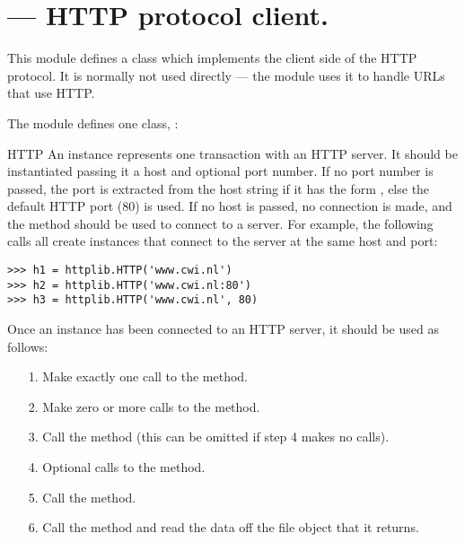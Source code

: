 \section{ ---
         HTTP protocol client.}




This module defines a class which implements the client side of the
HTTP protocol.  It is normally not used directly --- the module
 uses it to handle URLs that use
HTTP.

The module defines one class, :

\begin{classdesc}{HTTP}{}
An  instance
represents one transaction with an HTTP server.  It should be
instantiated passing it a host and optional port number.  If no port
number is passed, the port is extracted from the host string if it has
the form , else the default HTTP port (80)
is used.  If no host is passed, no connection is made, and the
 method should be used to connect to a server.  For
example, the following calls all create instances that connect to the
server at the same host and port:

\begin{verbatim}
>>> h1 = httplib.HTTP('www.cwi.nl')
>>> h2 = httplib.HTTP('www.cwi.nl:80')
>>> h3 = httplib.HTTP('www.cwi.nl', 80)
\end{verbatim}

Once an  instance has been connected to an HTTP server, it
should be used as follows:

\begin{enumerate}

\item[1.] Make exactly one call to the  method.

\item[2.] Make zero or more calls to the  method.

\item[3.] Call the  method (this can be omitted if
step 4 makes no calls).

\item[4.] Optional calls to the  method.

\item[5.] Call the  method.

\item[6.] Call the  method and read the data off the
file object that it returns.

\end{enumerate}
\end{classdesc}

